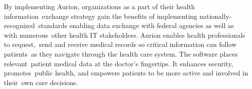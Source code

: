 \noindent By implementing Aurion, organizations as a part of their health information\
 exchange strategy gain the benefits of implementing nationally-recognized\
 standards enabling data exchange with federal agencies as well as with numerous\
 other health IT stakeholders. Aurion enables health professionals to request,\
 send and receive medical records so critical information can follow patients\
as they navigate through the health care system. The software places relevant\
 patient medical data at the doctor’s fingertips. It enhances security, promotes\
 public health, and empowers patients to be more active and involved in their\
 own care decisions.\citep{_aurion_software_2013}
